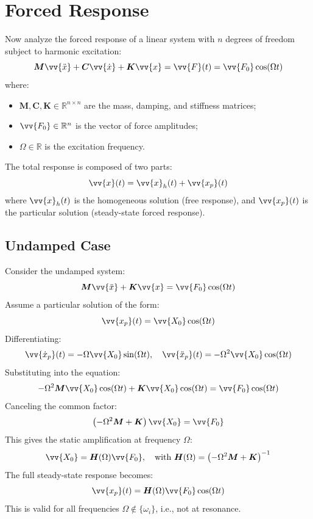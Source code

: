 \section{Forced Response}

Now analyze the forced response of a linear system with \( n \) degrees of freedom subject to harmonic excitation:
\[
\boldsymbol{M} \vv{\ddot{x}} + \boldsymbol{C} \vv{\dot{x}} + \boldsymbol{K} \vv{x} = \vv{F}(t) = \vv{F_0} \cos(\Omega t)
\]
where:

\begin{itemize}
    \item \( \boldsymbol{M}, \boldsymbol{C}, \boldsymbol{K} \in \mathbb{R}^{n\times n} \) are the mass, damping, and stiffness matrices;
    \item \( \vv{F_0} \in \mathbb{R}^n \) is the vector of force amplitudes;
    \item \( \Omega \in \mathbb{R} \) is the excitation frequency.
\end{itemize}

The total response is composed of two parts:
\[
\vv{x}(t) = \vv{x}_h(t) + \vv{x_p}(t)
\]
where \( \vv{x}_h(t) \) is the homogeneous solution (free response), and \( \vv{x_p}(t) \) is the particular solution (steady-state forced response).

\subsection{Undamped Case}

Consider the undamped system:
\[
\boldsymbol{M} \vv{\ddot{x}} + \boldsymbol{K} \vv{x} = \vv{F_0} \cos(\Omega t)
\]
Assume a particular solution of the form:
\[
\vv{x_p}(t) = \vv{X_0} \cos(\Omega t)
\]
Differentiating:
\[
\vv{\dot{x}_p}(t) = -\Omega \vv{X_0} \sin(\Omega t), \quad \vv{\ddot{x}_p}(t) = -\Omega^2 \vv{X_0} \cos(\Omega t)
\]
Substituting into the equation:
\[
-\Omega^2 \boldsymbol{M} \vv{X_0} \cos(\Omega t) + \boldsymbol{K} \vv{X_0} \cos(\Omega t) = \vv{F_0} \cos(\Omega t)
\]
Canceling the common factor:
\[
\left( -\Omega^2 \boldsymbol{M} + \boldsymbol{K} \right) \vv{X_0} = \vv{F_0}
\]
This gives the static amplification at frequency \( \Omega \):
\[
\vv{X_0} = \boldsymbol{H}(\Omega) \vv{F_0}, \quad \text{with } \boldsymbol{H}(\Omega) = \left( -\Omega^2 \boldsymbol{M} + \boldsymbol{K} \right)^{-1}
\]
The full steady-state response becomes:
\[
\vv{x_p}(t) = \boldsymbol{H}(\Omega) \vv{F_0} \cos(\Omega t)
\]
This is valid for all frequencies \( \Omega \notin \{\omega_i\} \), i.e., not at resonance.

